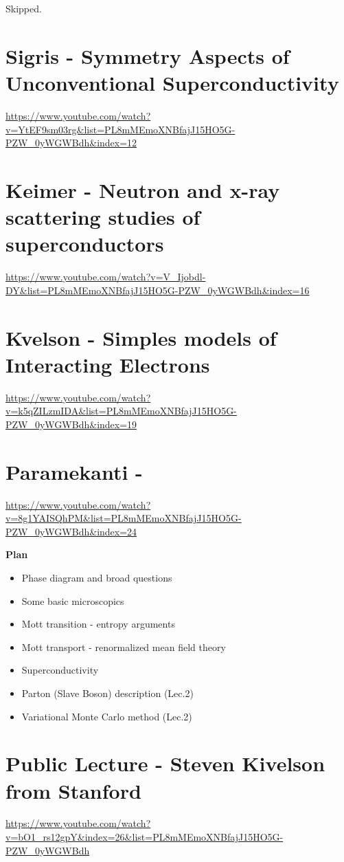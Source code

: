 \documentclass{article}
\begin{document}
Skipped.

\section{Sigris - Symmetry Aspects of Unconventional Superconductivity}
\label{sec:Sigris}
\url{https://www.youtube.com/watch?v=YtEF9sm03rg&list=PL8mMEmoXNBfajJ15HO5G-PZW_0yWGWBdh&index=12}

\section{Keimer - Neutron and x-ray scattering studies of superconductors}
\label{sec:Keimer}
\url{https://www.youtube.com/watch?v=V_Ijobdl-DY&list=PL8mMEmoXNBfajJ15HO5G-PZW_0yWGWBdh&index=16}


\section{Kvelson - Simples models of Interacting Electrons}
\label{sec:Kvelson}
\url{https://www.youtube.com/watch?v=k5qZILzmIDA&list=PL8mMEmoXNBfajJ15HO5G-PZW_0yWGWBdh&index=19}

\section{Paramekanti - }
\label{sec:Paramekanti}
\url{https://www.youtube.com/watch?v=8g1YAISQhPM&list=PL8mMEmoXNBfajJ15HO5G-PZW_0yWGWBdh&index=24}

\textbf{Plan}
\begin{itemize}
    \item Phase diagram and broad questions
    \item Some basic microscopics
    \item Mott transition - entropy arguments
    \item Mott transport - renormalized mean field theory
    \item Superconductivity
    \item Parton (Slave Boson) description (Lec.2)
    \item Variational Monte Carlo method (Lec.2)
\end{itemize}

\section{Public Lecture - Steven Kivelson from Stanford}
\label{sec:Public Lecture}
\url{https://www.youtube.com/watch?v=bO1_rs12gpY&index=26&list=PL8mMEmoXNBfajJ15HO5G-PZW_0yWGWBdh}
\end{document}
